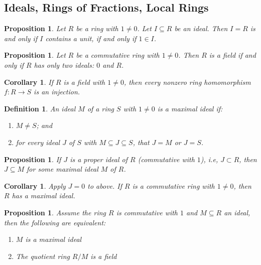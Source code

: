 \documentclass[a4paper,8pt]{article}
\theoremstyle{theorem}
\newtheorem{corollary}[theorem]{Corollary}
\newtheorem{proposition}[theorem]{Proposition}
\newtheorem{definition}[theorem]{Definition}
\begin{document}
\subsection{Ideals, Rings of Fractions, Local Rings}

\begin{proposition}
Let $R$ be a ring with $1 \neq 0$. Let $I \subseteq R$ be an ideal. Then $I=R$ is and only if $I$ contains a unit, if and only if $1 \in I$.
\end{proposition}


\begin{proposition}
Let $R$ be a commutative ring with $1 \neq 0$. Then $R$ is a field if and only if $R$ has only two ideals: $0$ and $R$.
\end{proposition}


\begin{corollary}
If $R$ is a field with $1 \neq 0$, then every nonzero ring homomorphism $f: R \rightarrow S$ is an injection.
\end{corollary}


\begin{definition}
An ideal $M$ of a ring $S$ with $1 \neq 0$ is a \textit{{\color{blue} maximal ideal}} if:
\begin{enumerate}[label=(\roman*)]
\item $M \neq S$; and
\item for every ideal $J$ of $S$ with $M \subseteq J \subseteq S$, that $J=M$ or $J=S$.
\end{enumerate}
\end{definition}


\begin{proposition}
If $J$ is a proper ideal of $R$ (commutative with $1$), i.e, $J \subset R$, then $J \subseteq M$ for some maximal ideal $M$ of $R$.
\end{proposition}


\begin{corollary}
Apply $J=0$ to above. If $R$ is a commutative ring with 	$1 \neq 0$, then $R$
 has a maximal ideal.
\end{corollary}


\begin{proposition}
Assume the ring $R$ is commutative with $1$	and $M \subseteq R$ an ideal, then the following are equivalent:
\begin{enumerate}[label=(\roman*)]
\item $M$ is a maximal ideal
\item The quotient ring $R/M$ is a field
\end{enumerate}
\end{proposition}
\end{document}
